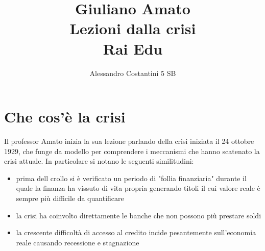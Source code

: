 \documentclass[11pt]{article}
\title{Giuliano Amato\\Lezioni dalla crisi\\Rai Edu}
\author{Alessandro Costantini 5 SB}
\begin{document}
\maketitle
\section{Che cos'\`e la crisi}
Il professor Amato inizia la sua lezione parlando della crisi
iniziata il 24 ottobre 1929, che funge da modello per comprendere i
meccanismi che hanno scatenato la crisi attuale.
In particolare si notano le seguenti similitudini:
\begin{itemize}
\item prima dell crollo si \`e verificato un periodo di "follia finanziaria"
durante il quale la finanza ha vissuto di vita propria generando titoli il cui valore reale \`e
sempre pi\`u difficile da quantificare
\item la crisi ha coinvolto direttamente le banche che non possono pi\`u
prestare soldi
\item la crescente difficolt\`a di accesso al credito incide pesantemente sull'economia
reale causando recessione e stagnazione
\end{itemize}
\end{document}
